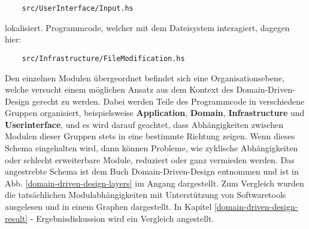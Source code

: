 \begin{verbatim}
    src/UserInterface/Input.hs
\end{verbatim}

lokalisiert. Programmcode, welcher mit dem Dateisystem interagiert, dagegen
hier:

\begin{verbatim}
    src/Infrastructure/FileModification.hs
\end{verbatim}

Den einzelnen Modulen übergeordnet befindet sich eine Organisationsebene, welche
versucht einem möglichen Ansatz aus dem Kontext des Domain-Driven-Design \cite{domain-driven-design} gerecht
zu werden. Dabei werden Teile des Programmcode in verschiedene Gruppen organisiert,
beispielsweise \textbf{Application}, \textbf{Domain}, \textbf{Infrastructure} und \textbf{Userinterface}, und es wird
darauf geachtet, dass Abhängigkeiten zwischen Modulen dieser Gruppen stets in
eine bestimmte Richtung zeigen. Wenn dieses Schema eingehalten wird, dann können
Probleme, wie zyklische Abhängigkeiten oder schlecht erweiterbare Module, reduziert
oder ganz vermieden werden. Das angestrebte Schema ist dem Buch Domain-Driven-Design \cite{domain-driven-design}
entnommen und ist in Abb. \ref{domain-driven-design-layers} im Angang dargestellt.
Zum Vergleich wurden die tatsächlichen Modulabhängigkeiten mit Unterstützung von
Softwaretools \cite{graphmod} \cite{xdot} ausgelesen und in einem Graphen dargestellt.
In Kapitel \ref{domain-driven-design-result} - Ergebnisdiskussion wird ein Vergleich
angestellt.